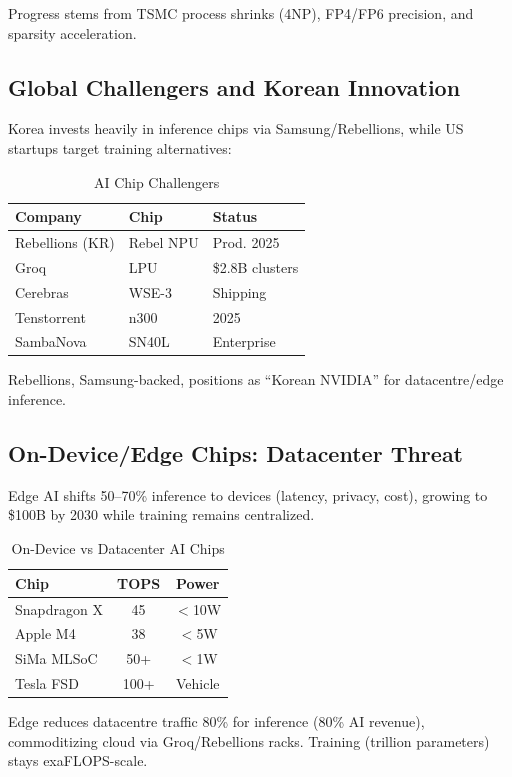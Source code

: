 Progress stems from TSMC process shrinks (4NP), FP4/FP6 precision, and sparsity acceleration.

\subsection{Global Challengers and Korean Innovation}

Korea invests heavily in inference chips via Samsung/Rebellions, while US startups target training alternatives:

\begin{table}[htbp]
\centering
\footnotesize
\caption{AI Chip Challengers}
\begin{tabular}{l l l}
\toprule
Company & Chip & Status \\
\midrule
Rebellions (KR) & Rebel NPU & Prod. 2025 \\
Groq & LPU & \$2.8B clusters \\
Cerebras & WSE-3 & Shipping \\
Tenstorrent & n300 & 2025 \\
SambaNova & SN40L & Enterprise \\
\bottomrule
\end{tabular}
\end{table}

Rebellions, Samsung-backed, positions as ``Korean NVIDIA'' for datacentre/edge inference.

\subsection{On-Device/Edge Chips: Datacenter Threat}

Edge AI shifts 50--70\% inference to devices (latency, privacy, cost), growing to \$100B by 2030 while training remains centralized.

\begin{table}[htbp]
\centering
\small
\caption{On-Device vs Datacenter AI Chips}
\begin{tabular}{l c c}
\toprule
Chip & TOPS & Power \\
\midrule
Snapdragon X & 45 & $<$10W \\
Apple M4 & 38 & $<$5W \\
SiMa MLSoC & 50+ & $<$1W \\
Tesla FSD & 100+ & Vehicle \\
\bottomrule
\end{tabular}
\end{table}

Edge reduces datacentre traffic 80\% for inference (80\% AI revenue), commoditizing cloud via Groq/Rebellions racks. Training (trillion parameters) stays exaFLOPS-scale.


